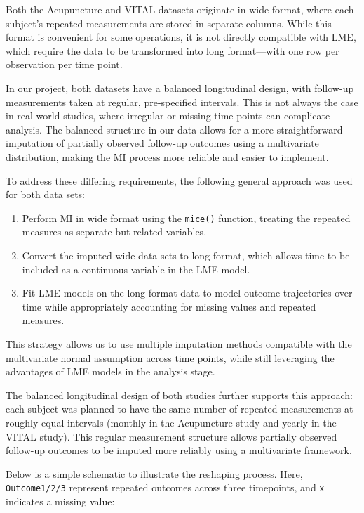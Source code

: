 \documentclass{article}
\providecommand{\tightlist}{%
  \setlength{\itemsep}{0pt}\setlength{\parskip}{0pt}}
\begin{document}
Both the Acupuncture and VITAL datasets originate in wide format, where
each subject's repeated measurements are stored in separate columns.
While this format is convenient for some operations, it is not directly
compatible with LME, which require the data to be transformed into long
format---with one row per observation per time point.

In our project, both datasets have a balanced longitudinal design, with
follow-up measurements taken at regular, pre-specified intervals. This
is not always the case in real-world studies, where irregular or missing
time points can complicate analysis. The balanced structure in our data
allows for a more straightforward imputation of partially observed
follow-up outcomes using a multivariate distribution, making the MI
process more reliable and easier to implement.

To address these differing requirements, the following general approach
was used for both data sets:

\begin{enumerate}
\def\labelenumi{\arabic{enumi}.}
\tightlist
\item
  Perform MI in wide format using the \texttt{mice()} function, treating
  the repeated measures as separate but related variables.
\item
  Convert the imputed wide data sets to long format, which allows time
  to be included as a continuous variable in the LME model.
\item
  Fit LME models on the long-format data to model outcome trajectories
  over time while appropriately accounting for missing values and
  repeated measures.
\end{enumerate}

This strategy allows us to use multiple imputation methods compatible
with the multivariate normal assumption across time points, while still
leveraging the advantages of LME models in the analysis stage.

The balanced longitudinal design of both studies further supports this
approach: each subject was planned to have the same number of repeated
measurements at roughly equal intervals (monthly in the Acupuncture
study and yearly in the VITAL study). This regular measurement structure
allows partially observed follow-up outcomes to be imputed more reliably
using a multivariate framework.

Below is a simple schematic to illustrate the reshaping process. Here,
\texttt{Outcome1/2/3} represent repeated outcomes across three
timepoints, and \texttt{x} indicates a missing value:
\end{document}
